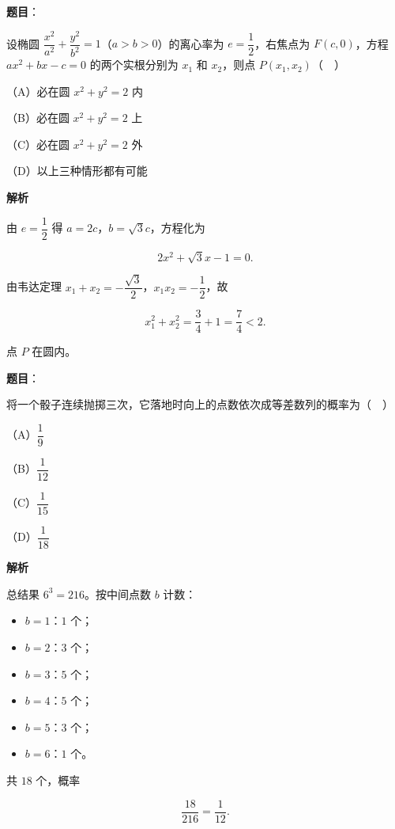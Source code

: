 \begin{answer}

\textbf{题目}：

设椭圆 $\dfrac{x^2}{a^2}+\dfrac{y^2}{b^2}=1$（$a>b>0$）的离心率为 $e=\dfrac12$，右焦点为 $F(c,0)$，方程 $ax^2+bx-c=0$ 的两个实根分别为 $x_1$ 和 $x_2$，则点 $P(x_1,x_2)$（　）

（A）必在圆 $x^2+y^2=2$ 内

（B）必在圆 $x^2+y^2=2$ 上

（C）必在圆 $x^2+y^2=2$ 外

（D）以上三种情形都有可能

\textbf{解析}

由 $e=\dfrac12$ 得 $a=2c$，$b=\sqrt3c$，方程化为

\nopagebreak[4]
\[2x^2+\sqrt3x-1=0.\]

由韦达定理 $x_1+x_2=-\dfrac{\sqrt3}{2}$，$x_1x_2=-\dfrac12$，故

\nopagebreak[4]
\[x_1^2+x_2^2=\frac34+1=\frac74<2.\]

点 $P$ 在圆内。


\end{answer}
\begin{answer}

\textbf{题目}：

将一个骰子连续抛掷三次，它落地时向上的点数依次成等差数列的概率为（　）

（A）$\dfrac19$

（B）$\dfrac1{12}$

（C）$\dfrac1{15}$

（D）$\dfrac1{18}$

\textbf{解析}

总结果 $6^3=216$。按中间点数 $b$ 计数：

\begin{itemize}
\item $b=1$：$1$ 个；
\item $b=2$：$3$ 个；
\item $b=3$：$5$ 个；
\item $b=4$：$5$ 个；
\item $b=5$：$3$ 个；
\item $b=6$：$1$ 个。
\end{itemize}

共 $18$ 个，概率

\nopagebreak[4]
\[\frac{18}{216}=\frac1{12}.\]


\end{answer}
